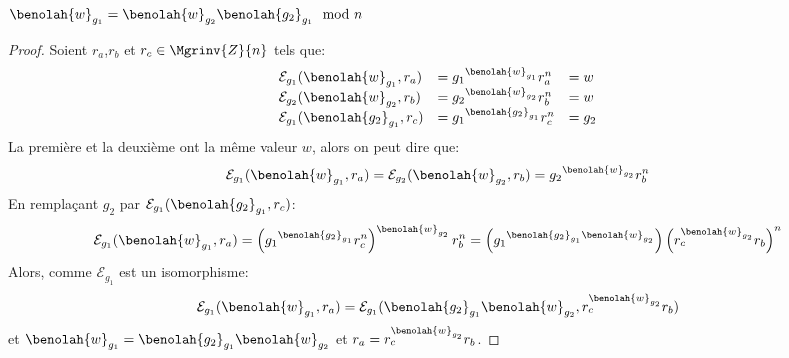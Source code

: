 	\begin{lemma} $\benolah{w}_{g_1} = \benolah{w}_{g_2}\benolah{g_2}_{g_1}\mod{n}$
		\label{lemma:equalbenolah}
		\begin{proof} Soient $r_a$,$r_b$ et $r_c \in \Mgrinv{Z}{n}$ tels que:
			\begin{equation}
				\begin{array}{lll}
					\mathcal{E}_{g_1}(\benolah{w  }_{g_1},r_a) &= {g_1}^{\benolah{w  }_{g_1}}r_a^n &=w \\ 
					\mathcal{E}_{g_2}(\benolah{w  }_{g_2},r_b) &= {g_2}^{\benolah{w  }_{g_2}}r_b^n &=w \\ 
					\mathcal{E}_{g_1}(\benolah{g_2}_{g_1},r_c) &= {g_1}^{\benolah{g_2}_{g_1}}r_c^n &=g_2 
				\end{array}
			\end{equation}
			La première et la deuxième ont la même valeur $w$, alors on peut dire que:
			\begin{equation*}
				\mathcal{E}_{g_1}(\benolah{w  }_{g_1},r_a) = \mathcal{E}_{g_2}(\benolah{w  }_{g_2},r_b) = {g_2}^{\benolah{w  }_{g_2}}r_b^n 
			\end{equation*}
			En remplaçant $g_2$ par  $\mathcal{E}_{g_1}(\benolah{g_2}_{g_1},r_c)$:
			\begin{equation*}
				\mathcal{E}_{g_1}(\benolah{w  }_{g_1},r_a) = \left({g_1}^{\benolah{g_2}_{g_1}}r_c^n \right)^{\benolah{w  }_{g_2}}r_b^n = \left({g_1}^{\benolah{g_2}_{g_1} \benolah{w  }_{g_2} } \right) \left(r_c^{\benolah{w  }_{g_2}}r_b\right)^n \end{equation*}						
			Alors, comme $\mathcal{E}_{g_1}$ est un isomorphisme:
			$$\mathcal{E}_{g_1}(\benolah{w  }_{g_1},r_a) = \mathcal{E}_{g_1}(\benolah{g_2}_{g_1} \benolah{w  }_{g_2},r_c^{\benolah{w  }_{g_2}}r_b) $$
			et $\benolah{w  }_{g_1} = \benolah{g_2}_{g_1} \benolah{w  }_{g_2}$ et $r_a = r_c^{\benolah{w  }_{g_2}}r_b$.
%
		\end{proof}
	\end{lemma}

